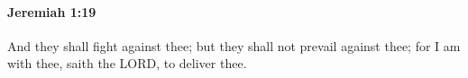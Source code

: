 
		\paragraph{Jeremiah 1:19} %
			\label{JEREMIAH-1-19}

			And they shall fight against thee; but they shall not prevail against thee; for I am with thee, saith the LORD, to deliver thee.

